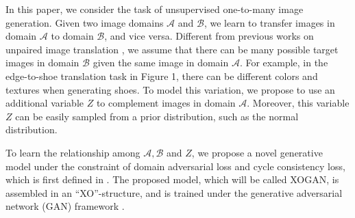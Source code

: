 \documentclass[conference]{IEEEtran}
\theoremstyle{definition}
\begin{document}

In this paper, we consider the task of unsupervised one-to-many image generation. Given two image domains $\mathcal A$ and $\mathcal B$, we learn
to transfer images in domain $\mathcal A$ to domain $\mathcal B$, and vice versa. Different from previous works on unpaired image translation \cite{kim2017learning, taigman2016unsupervised, zhu2017unpaired}, we assume that there can be many possible target images in domain $\mathcal B$ given the same image in domain $\mathcal A$. For example, in the edge-to-shoe translation task in Figure 1, there can be different colors and textures when generating shoes. To model this variation, we propose to use an additional variable $Z$ to complement images in domain $\mathcal A$. Moreover, this variable $Z$ can be easily sampled from a prior distribution, such as the normal distribution. 

To learn the relationship among $\mathcal A, \mathcal B$ and $Z$,
we propose a novel generative model under the constraint of domain adversarial loss and cycle consistency loss, which is first defined in \cite{zhu2017unpaired}.
The proposed model, which
will be called XOGAN,
is assembled in an ``XO''-structure, and is trained under the generative adversarial network (GAN) framework \cite{goodfellow2014generative, gulrajani2017improved, mirza2014conditional, salimans2016improved, arjovsky2017wasserstein}.

\end{document}
